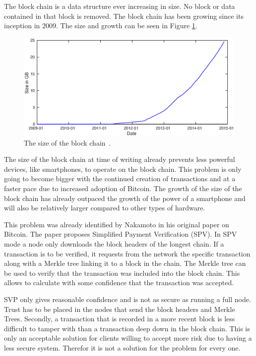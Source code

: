 The block chain is a data structure ever increasing in size.
No block or data contained in that block is removed.
The block chain has been growing since its inception in 2009.
The size and growth can be seen in Figure \ref{fig:bc-size}.

\begin{figure}
        \centerline{\includegraphics[scale=0.6]{relatedWork/figs/blockchainsize/blockchainsize.eps}}
        \caption{The size of the block chain~\cite{Blockchain.info-bcs}.}
	\label{fig:bc-size}
\end{figure}

The size of the block chain at time of writing already prevents less powerful devices, like smartphones,
to operate on the block chain.
This problem is only going to become bigger with the continued creation of transactions
and at a faster pace due to increased adoption of Bitcoin.
The growth of the size of the block chain has already outpaced the growth of the power of a smartphone
and will also be relatively larger compared to other types of hardware.

This problem was already identified by Nakamoto in his original paper on Bitcoin.
The paper proposes Simplified Payment Verification (SPV).
In SPV mode a node only downloads the block headers of the longest chain.
If a transaction is to be verified, it requests from the network the specific transaction
along with a Merkle tree linking it to a block in the chain.
The Merkle tree can be used to verify that the transaction was included into the block chain.
This allows to calculate with some confidence that the transaction was accepted.

SVP only gives reasonable confidence and is not as secure as running a full node.
Trust has to be placed in the nodes that send the block headers and Merkle Trees.
Secondly, a transaction that is recorded in a more recent block is less difficult to tamper with
than a transaction deep down in the block chain.
This is only an acceptable solution for clients willing to accept more risk due to having a less secure system.
Therefor it is not a solution for the problem for every one.

